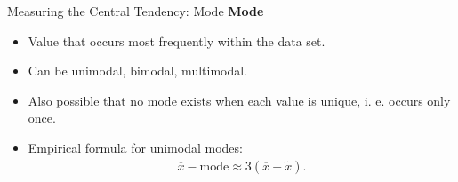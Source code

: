 \begin{frame}{Measuring the Central Tendency: Mode}
	\textbf{Mode}
	\begin{itemize}
		\item Value that occurs most frequently within the data set.
		\item Can be unimodal, bimodal, multimodal.
		\item Also possible that no mode exists when each value is unique,
		      i. e. occurs only once.
		\item Empirical formula for unimodal modes:
		      \begin{align}
			      \overline{x} - \text{mode} \approx 3(\overline{x}- \tilde{x}).
		      \end{align}
	\end{itemize}
\end{frame}

